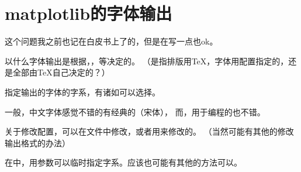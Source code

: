 \section{matplotlib的字体输出}

这个问题我之前也记在白皮书上了的，但是在写一点也ok。

以什么字体输出是根据，，等决定的。
（是指排版用\TeX ，字体用配置指定的，还是全部由\TeX 自己决定的？）

指定输出的字体的字系，有诸如可以选择。

一般，中文字体感觉不错的有经典的（宋体），
而，用于编程的也不错。

关于修改配置，可以在文件中修改，或者用来修改的。
（当然可能有其他的修改输出格式的办法）

在中，用参数可以临时指定字系。应该也可能有其他的方法可以。
